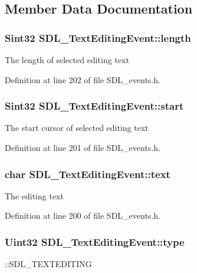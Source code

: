 \subsection{Member Data Documentation}
\hypertarget{structSDL__TextEditingEvent_adca95505c0bf212834930df58f6d1aa5}{
\subsubsection[{length}]{\setlength{\rightskip}{0pt plus 5cm}Sint32 S\+D\+L\+\_\+\+Text\+Editing\+Event\+::length}}\label{structSDL__TextEditingEvent_adca95505c0bf212834930df58f6d1aa5}
The length of selected editing text 

Definition at line 202 of file S\+D\+L\+\_\+events.\+h.

\hypertarget{structSDL__TextEditingEvent_ac6c6a00835d92b12c0ba5b78b5ad676d}{
\subsubsection[{start}]{\setlength{\rightskip}{0pt plus 5cm}Sint32 S\+D\+L\+\_\+\+Text\+Editing\+Event\+::start}}\label{structSDL__TextEditingEvent_ac6c6a00835d92b12c0ba5b78b5ad676d}
The start cursor of selected editing text 

Definition at line 201 of file S\+D\+L\+\_\+events.\+h.

\hypertarget{structSDL__TextEditingEvent_a1958926585189f459190e115e58d73a6}{
\subsubsection[{text}]{\setlength{\rightskip}{0pt plus 5cm}char S\+D\+L\+\_\+\+Text\+Editing\+Event\+::text}}\label{structSDL__TextEditingEvent_a1958926585189f459190e115e58d73a6}
The editing text 

Definition at line 200 of file S\+D\+L\+\_\+events.\+h.

\hypertarget{structSDL__TextEditingEvent_a198e6df194a3bf12cf5f82553e84c7cb}{
\subsubsection[{type}]{\setlength{\rightskip}{0pt plus 5cm}Uint32 S\+D\+L\+\_\+\+Text\+Editing\+Event\+::type}}\label{structSDL__TextEditingEvent_a198e6df194a3bf12cf5f82553e84c7cb}
\+::\+S\+D\+L\+\_\+\+T\+E\+X\+T\+E\+D\+I\+T\+I\+N\+G 

